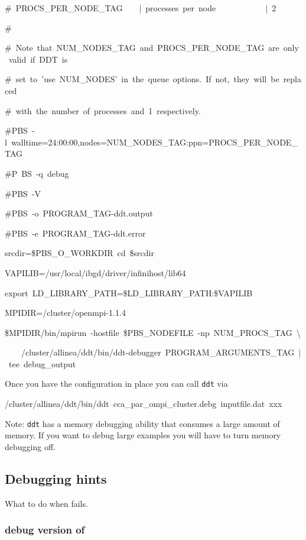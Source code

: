 \begin{itemize}
\begin{lyxcode}
\#~PROCS\_PER\_NODE\_TAG~~~~|~processes~per~node~~~~~~~~~~~~|~2~

\#~

\#~Note~that~NUM\_NODES\_TAG~and~PROCS\_PER\_NODE\_TAG~are~only~valid~if~DDT~is~

\#~set~to~'use~NUM\_NODES'~in~the~queue~options.~If~not,~they~will~be~replaced~

\#~with~the~number~of~processes~and~1~respectively.

\#PBS~-l~walltime=24:00:00,nodes=NUM\_NODES\_TAG:ppn=PROCS\_PER\_NODE\_TAG~

\#P~BS~-q~debug~

\#PBS~-V~

\#PBS~-o~PROGRAM\_TAG-ddt.output~

\#PBS~-e~PROGRAM\_TAG-ddt.error



srcdir=\$PBS\_O\_WORKDIR~cd~\$srcdir

VAPILIB=/usr/local/ibgd/driver/infinihost/lib64

export~LD\_LIBRARY\_PATH=\$LD\_LIBRARY\_PATH:\$VAPILIB

MPIDIR=/cluster/openmpi-1.1.4

\$MPIDIR/bin/mpirun~-hostfile~\$PBS\_NODEFILE~-np~NUM\_PROCS\_TAG~\textbackslash

~~~~/cluster/allinea/ddt/bin/ddt-debugger~PROGRAM\_ARGUMENTS\_TAG~|~tee~debug\_output
\end{lyxcode}
\end{itemize}
Once you have the configuration in place you can call \texttt{ddt}
via

\begin{lyxcode}
/cluster/allinea/ddt/bin/ddt~cca\_par\_ompi\_cluster.debg~inputfile.dat~xxx
\end{lyxcode}
Note: \texttt{ddt} has a memory debugging ability that consumes a
large amount of memory. If you want to debug large examples you will
have to turn memory debugging off.


\subsection{Debugging hints}

What to do when \ccarat{} fails.


\subsubsection{debug version of \ccarat{}}

